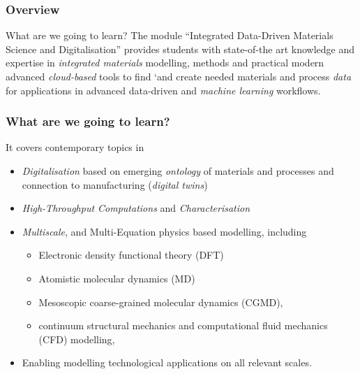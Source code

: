 \documentclass[aspectratio=169]{beamer}
\begin{document}
\begin{frame}
  \frametitle{Overview}

  \begin{alertblock}{What are we going to learn?}
    The module “Integrated Data-Driven Materials Science and Digitalisation” provides students with state-of-the art knowledge and expertise in {\it integrated materials} modelling, methods and practical modern advanced {\it cloud-based} tools to find `and create needed materials and process {\it data} for applications in advanced data-driven and {\it machine learning} workflows. 
  \end{alertblock}

\end{frame}


\begin{frame}
  \frametitle{What are we going to learn?}
    It covers contemporary topics in 
    \begin{itemize}
      \item {\it Digitalisation} based on emerging {\it ontology} of materials and processes and connection to manufacturing ({\it digital twins})
     \item {\it High-Throughput Computations} and {\it Characterisation}
     \item {\it Multiscale}, and Multi-Equation physics based modelling, including
       \begin{itemize}
         \item Electronic density functional theory (DFT)
         \item Atomistic molecular dynamics (MD)
         \item Mesoscopic coarse-grained molecular dynamics (CGMD),
         \item continuum structural mechanics and computational fluid mechanics (CFD) modelling,
   \end{itemize}
     \item Enabling modelling technological applications on all relevant scales.
   \end{itemize}

\end{frame}
\end{document}
